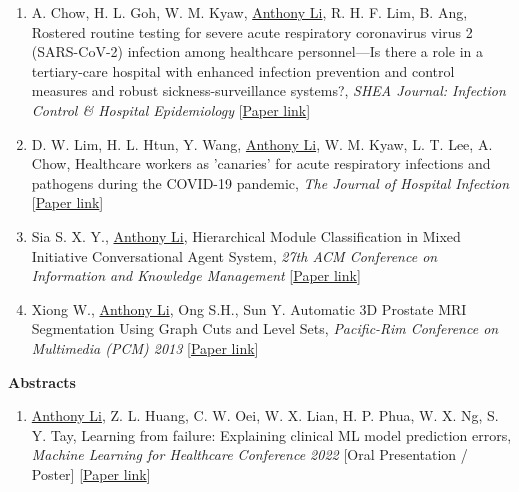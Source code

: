\documentclass[letterpaper,10pt,oneside]{article}
\begin{document}
\begin{body}
\begin{enumerate}
\item A. Chow, H. L. Goh, W. M. Kyaw, \underline{Anthony Li}, R. H. F. Lim, B. Ang, \textcolor{mygray}{Rostered routine testing for severe acute respiratory coronavirus virus 2 (SARS-CoV-2) infection among healthcare personnel—Is there a role in a tertiary-care hospital with enhanced infection prevention and control measures and robust sickness-surveillance systems?}, \textit{SHEA Journal: Infection Control \& Hospital Epidemiology} [\href{https://www.cambridge.org/core/journals/infection-control-and-hospital-epidemiology/article/rostered-routine-testing-for-severe-acute-respiratory-coronavirus-virus-2-sarscov2-infection-among-healthcare-personnelis-there-a-role-in-a-tertiarycare-hospital-with-enhanced-infection-prevention-and-control-measures-and-robust-sicknesssurveillance-systems/30E175AEA1FBA0080DBB281D436D477B}{Paper link}]

\item D. W. Lim, H. L. Htun, Y. Wang, \underline{Anthony Li}, W. M. Kyaw, L. T. Lee, A. Chow, \textcolor{mygray}{Healthcare workers as 'canaries' for acute respiratory infections and pathogens during the COVID-19 pandemic}, \textit{The Journal of Hospital Infection} [\href{https://www.journalofhospitalinfection.com/article/S0195-6701(21)00140-7/fulltext}{Paper link}]

\item Sia S. X. Y., \underline{Anthony Li}, \textcolor{mygray}{Hierarchical Module Classification in Mixed Initiative Conversational Agent System}, \textit{27th ACM Conference on Information and Knowledge Management}
[\href{https://dl.acm.org/citation.cfm?id=3133185}{Paper link}]

\item Xiong W., \underline{Anthony Li}, Ong S.H., Sun Y. \textcolor{mygray}{Automatic 3D Prostate MRI Segmentation Using Graph Cuts and Level Sets}, \textit{Pacific-Rim Conference on Multimedia (PCM) 2013}
[\href{https://link.springer.com/chapter/10.1007/978-3-319-03731-8_20}{Paper link}]
\end{enumerate}

\textbf{Abstracts}
\GapNoBreak
{}

\begin{enumerate}

\item \underline{Anthony Li}, Z. L. Huang, C. W. Oei, W. X. Lian, H. P. Phua, W. X. Ng, S. Y. Tay, \textcolor{mygray}{Learning from failure: Explaining clinical ML model prediction errors}, \textit{Machine Learning for Healthcare Conference 2022} [Oral Presentation / Poster]
[\href{https://static1.squarespace.com/static/59d5ac1780bd5ef9c396eda6/t/62e97c1b5754a426fa21d3bf/1659468827549/16+MLHC_Explaining_ML_model_failures_v4.pdf}{Paper link}]


\end{enumerate}
\end{body}
\end{document}
